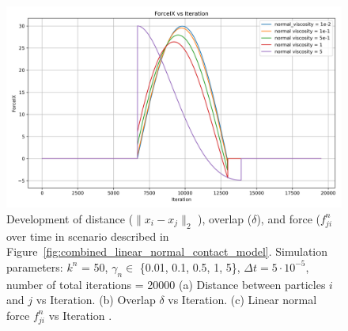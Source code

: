 \documentclass[11pt,
               a4paper,
               bibtotoc,
               idxtotoc,
               headsepline,
               footsepline,
               footexclude,
               BCOR12mm,
               DIV13,
               openany,   %
               ]
               {scrbook}
\begin{document}
\begin{figure}[H]
	\begin{minipage}[t]{0.65\textwidth}
		\centering
		\includegraphics[width=\textwidth]{figures/contactForceLaws/linearNormalContactModel/ForceIX vs Iterationsimple_collision_two_particles_statistics_stiffness_50_viscosity_1e-2.png}
	\end{minipage}
	
	\caption[Combined Caption]{Development of distance ($\lVert x_i - x_j \rVert_2$ ), overlap ($\delta$), and force ($f^n_{ji}$ over time in scenario described in Figure~\ref{fig:combined_linear_normal_contact_model}. Simulation parameters: $k^n$ = 50, $\gamma_n \in $ \{0.01, 0.1, 0.5, 1, 5\}, $\Delta t = 5 \cdot 10^{-5}$, number of total iterations = 20000 (a) Distance between particles $i$ and $j$ vs Iteration. (b) Overlap $\delta$ vs Iteration. (c) Linear normal force $f^n_{ji}$ vs Iteration .}
	\label{fig:Distance_Overlap_Force_plots}
\end{figure}
\end{document}
